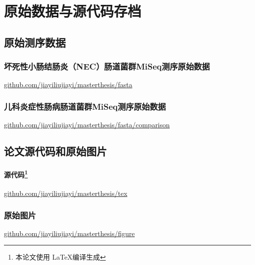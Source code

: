 \chapter{原始数据与源代码存档}
\label{app:archive}

\section{原始测序数据}
\subsection{坏死性小肠结肠炎（NEC）肠道菌群MiSeq测序原始数据}
\href{github.com/jiayiliujiayi/masterthesis/fasta}{github.com/jiayiliujiayi/masterthesis/fasta}
\subsection{儿科炎症性肠病肠道菌群MiSeq测序原始数据}
\href{github.com/jiayiliujiayi/masterthesis/fasta/comparison}{github.com/jiayiliujiayi/masterthesis/fasta/comparison}

\section{论文源代码和原始图片}
\subsubsection{源代码\protect\footnote{本论文使用 \LaTeX 编译生成}}
\href{github.com/jiayiliujiayi/masterthesis/tex}{github.com/jiayiliujiayi/masterthesis/tex}
\subsection{原始图片}
\href{github.com/jiayiliujiayi/masterthesis/figure}{github.com/jiayiliujiayi/masterthesis/figure}
